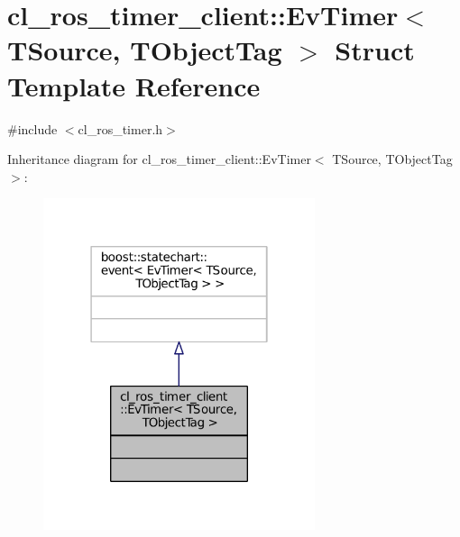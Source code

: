 \hypertarget{structcl__ros__timer__client_1_1EvTimer}{}\section{cl\+\_\+ros\+\_\+timer\+\_\+client\+:\+:Ev\+Timer$<$ T\+Source, T\+Object\+Tag $>$ Struct Template Reference}
\label{structcl__ros__timer__client_1_1EvTimer}


{\ttfamily \#include $<$cl\+\_\+ros\+\_\+timer.\+h$>$}



Inheritance diagram for cl\+\_\+ros\+\_\+timer\+\_\+client\+:\+:Ev\+Timer$<$ T\+Source, T\+Object\+Tag $>$\+:
\nopagebreak
\begin{figure}[H]
\begin{center}
\leavevmode
\includegraphics[width=226pt]{structcl__ros__timer__client_1_1EvTimer__inherit__graph}
\end{center}
\end{figure}


